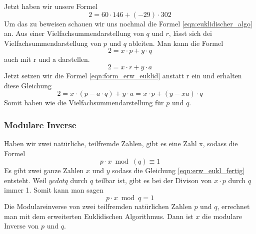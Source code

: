 %
Jetzt haben wir unsere Formel
%
\begin{equation}
 2 = 60 \cdot 146 + (-29) \cdot 302
\end{equation}
%
Um das zu beweisen schauen wir uns nochmal die Formel \ref{eqn:euklidischer_algo} an. Aus einer Vielfachsummendarstellung von $q$ und $r$, lässt sich dei Vielfachsummendarstellung von $p$ und $q$ ableiten. Man kann die Formel
\begin{equation*}
  2 = x \cdot p + y \cdot q
  \label{eqn:erw_eukl_fertig}
\end{equation*}
%
auch mit r und a darstellen.
%
\begin{equation*}
  2 = x \cdot r + y \cdot a
\end{equation*}
%
Jetzt setzen wir die Formel \ref{eqn:form_erw_euklid} anstatt r ein und erhalten diese Gleichung
\begin{equation*}
  2 = x \cdot (p - a \cdot q)  + y \cdot a = x \cdot p + (y - xa) \cdot q
\end{equation*}
%
Somit haben wie die Vielfachsummendarstellung für $p$ und $q$.
%
\subsubsection{Modulare Inverse}
Haben wir zwei natürliche, teilfremde Zahlen, gibt es eine Zahl x, sodass die Formel
%
\begin{equation*}
  p \cdot x \bmod(q) \equiv 1
\end{equation*}
%
Es gibt zwei ganze Zahlen $x$ und $y$ sodass die Gleichung \ref{eqn:erw_eukl_fertig} entsteht.
Weil $y cdot q$ durch $q$ teilbar ist, gibt es bei der Divison von $x \cdot p$ durch $q$ immer 1. Somit kann man sagen
%
\begin{equation}
  p \cdot x \bmod q = 1
  \label{eqn:mod_inverse}
\end{equation}
%
Die Modulareinverse von zwei teilfremden natürlichen Zahlen $p$ und $q$, errechnet man mit dem erweiterten Euklidischen Algorithmus. Dann ist $x$ die modulare Inverse von $p$ und $q$.
